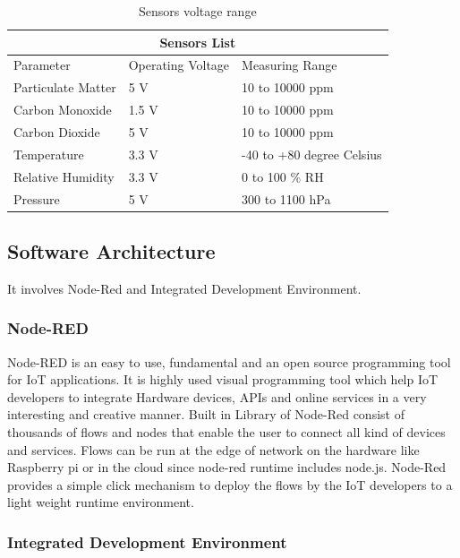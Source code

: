 \begin{table}[!ht]
\centering
\begin{tabular}{ |p{4cm}|p{4cm}|p{4cm}|  }
\hline
\multicolumn{3}{|c|}{Sensors List} \\
\hline
Parameter & Operating Voltage & Measuring Range \\
\hline
Particulate Matter & 5 V  & 10 to 10000 ppm\\
Carbon Monoxide & 1.5 V  &10 to 10000 ppm\\
Carbon Dioxide & 5 V  & 10 to 10000 ppm\\
Temperature & 3.3 V  & -40 to +80 degree Celsius\\
Relative Humidity & 3.3 V & 0 to 100 \% RH\\
Pressure & 5 V & 300 to 1100 hPa\\
\hline
\end{tabular}
\caption{\label{sensorsvoltage}Sensors voltage range}
\end{table}


\subsection{Software Architecture}

It involves Node-Red and Integrated Development
Environment.

\subsubsection{Node-RED}

Node-RED is an easy to use, fundamental and an open
source programming tool for IoT applications. It is highly
used visual programming tool which help IoT developers to
integrate Hardware devices, APIs and online services in a very
interesting and creative manner. Built in Library of Node-Red
consist of thousands of flows and nodes that enable the user to
connect all kind of devices and services. Flows can be run at
the edge of network on the hardware like Raspberry pi or in
the cloud since node-red runtime includes node.js. Node-Red
provides a simple click mechanism to deploy the flows by the
IoT developers to a light weight runtime environment.

\subsubsection{Integrated Development Environment}

